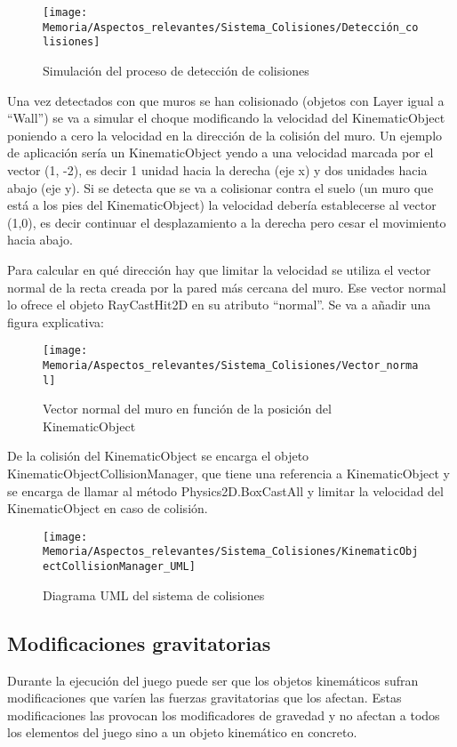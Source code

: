 \clearpage
\begin{figure}[h]
\centering
\texttt{[image: Memoria/Aspectos\_relevantes/Sistema\_Colisiones/Detección\_colisiones]}
\caption{Simulación del proceso de detección de colisiones}
\end{figure}

Una vez detectados con que muros se han colisionado (objetos con Layer igual a “Wall”) se va a simular el choque modificando la velocidad del KinematicObject poniendo a cero la velocidad en la dirección de la colisión del muro. Un ejemplo de aplicación sería un KinematicObject yendo a una velocidad marcada por el vector (1, -2), es decir 1 unidad hacia la derecha (eje x) y dos unidades hacia abajo (eje y). Si se detecta que se va a colisionar contra el suelo (un muro que está a los pies del KinematicObject) la velocidad debería establecerse al vector (1,0), es decir continuar el desplazamiento a la derecha pero cesar el movimiento hacia abajo.

Para calcular en qué dirección hay que limitar la velocidad se utiliza el vector normal de la recta creada por la pared más cercana del muro. Ese vector normal lo ofrece el objeto RayCastHit2D en su atributo “normal”.
Se va a añadir una figura explicativa:

\clearpage
\begin{figure}[h]
\centering
\texttt{[image: Memoria/Aspectos\_relevantes/Sistema\_Colisiones/Vector\_normal]}
\caption{Vector normal del muro en función de la posición del KinematicObject}
\end{figure}

De la colisión del KinematicObject se encarga el objeto KinematicObjectCollisionManager, que tiene una referencia a KinematicObject y se encarga de llamar al método Physics2D.BoxCastAll y limitar la velocidad del KinematicObject en caso de colisión.

\begin{figure}[h]
\centering
\texttt{[image: Memoria/Aspectos\_relevantes/Sistema\_Colisiones/KinematicObjectCollisionManager\_UML]}
\caption{Diagrama UML del sistema de colisiones}
\end{figure}

\subsection{Modificaciones gravitatorias}
Durante la ejecución del juego puede ser que los objetos kinemáticos sufran modificaciones que varíen las fuerzas gravitatorias que los afectan. Estas modificaciones las provocan los modificadores de gravedad y no afectan a todos los elementos del juego sino a un objeto kinemático en concreto.


